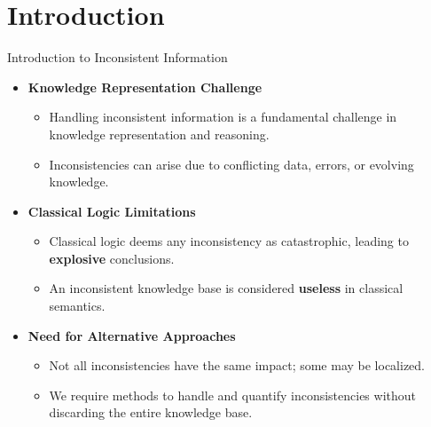 \section{Introduction}

\begin{frame}{Introduction to Inconsistent Information}
    \begin{itemize}
        \item \textbf{Knowledge Representation Challenge}
              \begin{itemize}
                  \item Handling inconsistent information is a fundamental challenge in knowledge representation and reasoning.
                  \item Inconsistencies can arise due to conflicting data, errors, or evolving knowledge.
              \end{itemize}
        \item \textbf{Classical Logic Limitations}
              \begin{itemize}
                  \item Classical logic deems any inconsistency as catastrophic, leading to \textbf{explosive} conclusions.
                  \item An inconsistent knowledge base is considered \textbf{useless} in classical semantics.
              \end{itemize}
        \item \textbf{Need for Alternative Approaches}
              \begin{itemize}
                  \item Not all inconsistencies have the same impact; some may be localized.
                  \item We require methods to handle and quantify inconsistencies without discarding the entire knowledge base.
              \end{itemize}
    \end{itemize}
\end{frame}

